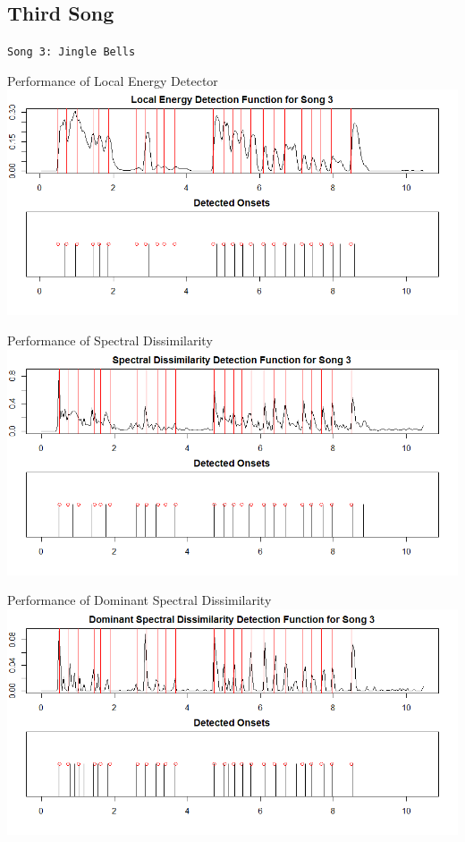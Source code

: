 \documentclass[10pt]{beamer}
\begin{document}
\subsection{Third Song}
{
\begin{frame}[standout]
  \texttt{Song 3: Jingle Bells}
\end{frame}
}

\begin{frame}{Performance of Local Energy Detector}
    \includegraphics[width = \textwidth]{fig/energy_song3.png}
\end{frame}

\begin{frame}{Performance of Spectral Dissimilarity}
    \includegraphics[width = \textwidth]{fig/spectral_song3.png}
\end{frame}

\begin{frame}{Performance of Dominant Spectral Dissimilarity}
    \includegraphics[width = \textwidth]{fig/dfreq_song3.png}
\end{frame}
\end{document}
